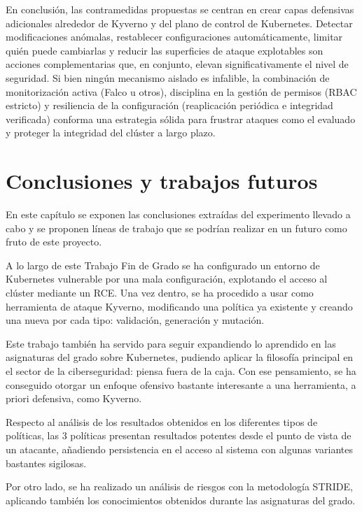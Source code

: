 \documentclass[12pt,twoside,titlepage]{report}
\newcommand\blankpage{%
    \newpage
    \null
    \thispagestyle{empty}%
    \newpage}
\begin{document}
En conclusión, las contramedidas propuestas se centran en crear capas defensivas adicionales alrededor de Kyverno y del plano de control de Kubernetes. Detectar modificaciones anómalas, restablecer configuraciones automáticamente, limitar quién puede cambiarlas y reducir las superficies de ataque explotables son acciones complementarias que, en conjunto, elevan significativamente el nivel de seguridad. Si bien ningún mecanismo aislado es infalible, la combinación de monitorización activa (Falco u otros), disciplina en la gestión de permisos (RBAC estricto) y resiliencia de la configuración (reaplicación periódica e integridad verificada) conforma una estrategia sólida para frustrar ataques como el evaluado y proteger la integridad del clúster a largo plazo.


\chapter{Conclusiones y trabajos futuros}\label{chap:conclusiones}

En este capítulo se exponen las conclusiones extraídas del experimento llevado a cabo y se proponen líneas de trabajo que se podrían realizar en un futuro como fruto de este proyecto.

A lo largo de este Trabajo Fin de Grado se ha configurado un entorno de Kubernetes vulnerable por una mala configuración, explotando el acceso al clúster mediante un RCE. Una vez dentro, se ha procedido a usar como herramienta de ataque Kyverno, modificando una política ya existente y creando una nueva por cada tipo: validación, generación y mutación.

Este trabajo también ha servido para seguir expandiendo lo aprendido en las asignaturas del grado sobre Kubernetes, pudiendo aplicar la filosofía principal en el sector de la ciberseguridad: piensa fuera de la caja. Con ese pensamiento, se ha conseguido otorgar un enfoque ofensivo bastante interesante a una herramienta, a priori defensiva, como Kyverno. 

Respecto al análisis de los resultados obtenidos en los diferentes tipos de políticas, las 3 políticas presentan resultados potentes desde el punto de vista de un atacante, añadiendo persistencia en el acceso al sistema con algunas variantes bastantes sigilosas.

Por otro lado, se ha realizado un análisis de riesgos con la metodología STRIDE, aplicando también los conocimientos obtenidos durante las asignaturas del grado.
\end{document}
